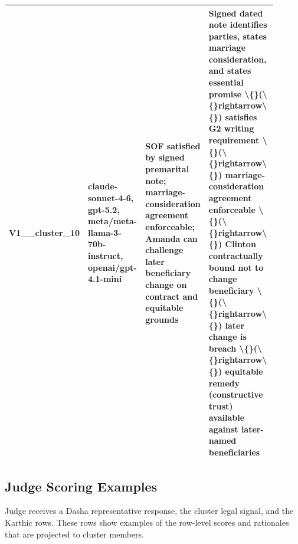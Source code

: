 \begin{longtable}{p{0.12\linewidth}p{0.22\linewidth}p{0.22\linewidth}p{0.34\linewidth}}
V1\_\_cluster\_10 & claude-sonnet-4-6, gpt-5.2, meta/meta-llama-3-70b-instruct, openai/gpt-4.1-mini & SOF satisfied by signed premarital note; marriage-consideration agreement enforceable; Amanda can challenge later beneficiary change on contract and equitable grounds & Signed dated note identifies parties, states marriage consideration, and states essential promise \textbackslash\{\}(\textbackslash\{\}rightarrow\textbackslash\{\}) satisfies G2 writing requirement \textbackslash\{\}(\textbackslash\{\}rightarrow\textbackslash\{\}) marriage-consideration agreement enforceable \textbackslash\{\}(\textbackslash\{\}rightarrow\textbackslash\{\}) Clinton contractually bound not to change beneficiary \textbackslash\{\}(\textbackslash\{\}rightarrow\textbackslash\{\}) later change is breach \textbackslash\{\}(\textbackslash\{\}rightarrow\textbackslash\{\}) equitable remedy (constructive trust) available against later-named beneficiaries \\
\bottomrule
\end{longtable}

\subsection{Judge Scoring Examples}

Judge receives a Dasha representative response, the cluster legal signal, and the Karthic rows. These rows show examples of the row-level scores and rationales that are projected to cluster members.

